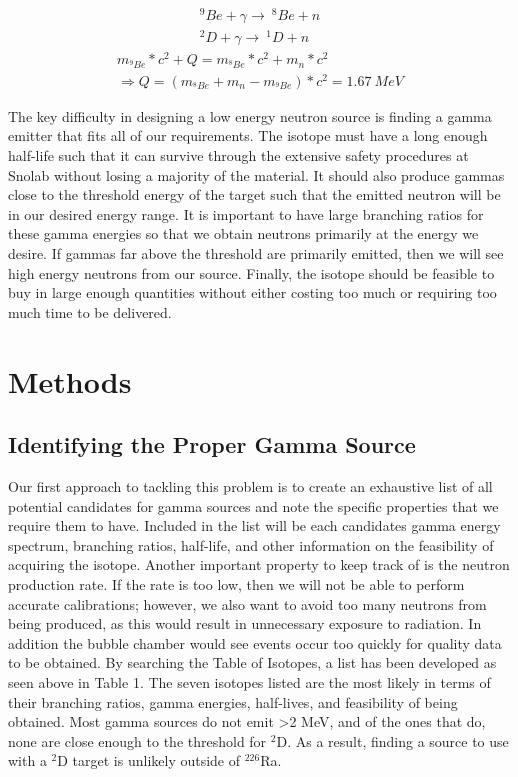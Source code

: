 \documentclass[%
12pt,
twoside,
reprint,
amsmath,amssymb,
aps,
]{article}
\begin{document}
	\begin{equation}
	\begin{aligned}	
	^{9}Be + \gamma \longrightarrow\ ^{8}Be + n \\
	^{2}D + \gamma \longrightarrow\ ^{1}D + n
	\end{aligned}
	\end{equation}	
	\begin{equation}
	\begin{aligned}	
	m_{^{9}Be} * c^{2} + Q = m_{^{8}Be} * c^{2} + m_{n} * c^{2} \\
	\Rightarrow Q = (m_{^{8}Be} + m_{n} - m_{^{9}Be}) * c^{2} = 1.67\ MeV
	\end{aligned}
	\end{equation}
	
	\par The key difficulty in designing a low energy neutron source is finding a gamma emitter that fits all of our requirements. The isotope must have a long enough half-life such that it can survive through the extensive safety procedures at Snolab without losing a majority of the material. It should also produce gammas close to the threshold energy of the target such that the emitted neutron will be in our desired energy range. It is important to have large branching ratios for these gamma energies so that we obtain neutrons primarily at the energy we desire. If gammas far above the threshold are primarily emitted, then we will see high energy neutrons from our source. Finally, the isotope should be feasible to buy in large enough quantities without either costing too much or requiring too much time to be delivered.
	
	\section{Methods}
	\subsection{Identifying the Proper Gamma Source}
	\par Our first approach to tackling this problem is to create an exhaustive list of all potential candidates for gamma sources and note the specific properties that we require them to have. Included in the list will be each candidates gamma energy spectrum, branching ratios, half-life, and other information on the feasibility of acquiring the isotope. Another important property to keep track of is the neutron production rate. If the rate is too low, then we will not be able to perform accurate calibrations; however, we also want to avoid too many neutrons from being produced, as this would result in unnecessary exposure to radiation. In addition the bubble chamber would see events occur too quickly for quality data to be obtained.
	By searching the Table of Isotopes, a list has been developed as seen above in Table 1. The seven isotopes listed are the most likely in terms of their branching ratios, gamma energies, half-lives, and feasibility of being obtained. Most gamma sources do not emit >2 MeV, and of the ones that do, none are close enough to the threshold for $^{2}$D. As a result, finding a source to use with a $^{2}$D target is unlikely outside of $^{226}$Ra. 	
		
\end{document}
